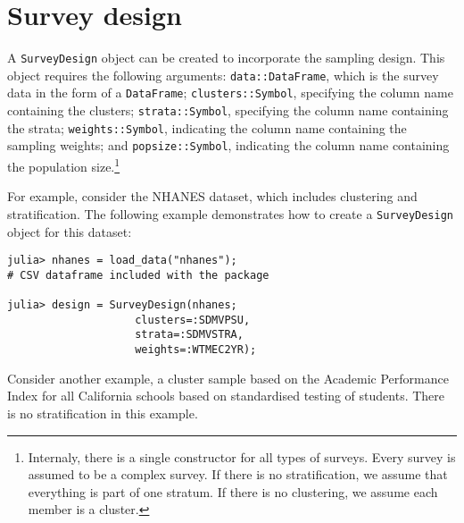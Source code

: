 \documentclass{juliacon}
\begin{document}


\section{Survey design}

A \verb|SurveyDesign| object can be created to incorporate the sampling design. This object requires the following arguments: \verb|data::DataFrame|, which is the survey data in the form of a \verb|DataFrame|; \verb|clusters::Symbol|, specifying the column name containing the clusters; \verb|strata::Symbol|, specifying the column name containing the strata; \verb|weights::Symbol|, indicating the column name containing the sampling weights; and \verb|popsize::Symbol|, indicating the column name containing the population size.\footnote{Internaly, there is a single constructor for all types of surveys. Every survey is assumed to be a complex survey. If there is no stratification, we assume that everything is part of one stratum. If there is no clustering, we assume each member is a cluster.}  

For example, consider the NHANES dataset, which includes clustering and stratification. The following example demonstrates how to create a \verb|SurveyDesign| object for this dataset:
\begin{lstlisting}
julia> nhanes = load_data("nhanes"); 
# CSV dataframe included with the package

julia> design = SurveyDesign(nhanes;
                    clusters=:SDMVPSU,
                    strata=:SDMVSTRA, 
                    weights=:WTMEC2YR);
    \end{lstlisting}
Consider another example, a cluster sample based on the Academic Performance Index for all California schools based on standardised testing of students. There is no stratification in this example. 
\end{document}
